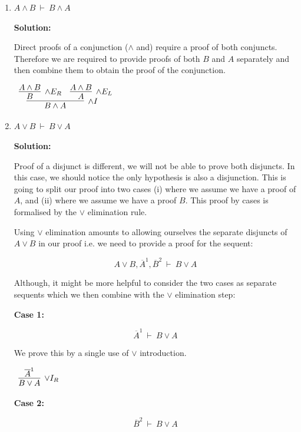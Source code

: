 \documentclass[11pt]{report}
\newcommand{\temp}[2]{{\overline{#2}}^{#1}}
\begin{document}
\begin{enumerate}
\begin{enumerate}
		\item $A \land B \ \vdash \ B \land A$
		

		\textbf{Solution:}

		Direct proofs of a conjunction ($\land$ and) require a proof of both conjuncts. Therefore we are required to provide proofs of both $B$ and $A$ separately and then combine them to obtain the proof of the conjunction. 

		\begin{center}
			$\begin{array}{c}
				\infer[\land I]{B \land A}
					{\infer[\land E_{R}]{B}
						{A \land B}
					&
					\infer[\land E_{L}]{A}
						{A \land B}}
			\end{array}$
		\end{center}
			
		\newpage
		\item $A \lor B \ \vdash \ B \lor A$
		
		\textbf{Solution:}

		Proof of a disjunct is different, we will not be able to prove both disjuncts. In this case, we should notice the only hypothesis is also a disjunction. This is going to split our proof into two cases (i) where we assume we have a proof of $A$, and (ii) where we assume we have a proof $B$. This proof by cases is formalised by the $\lor$ elimination rule. 

		Using $\lor$ elimination amounts to allowing ourselves the separate disjuncts of $A \lor B$ in our proof i.e. we need to provide a proof for the sequent: 

		$$A \lor B, \temp{1}{A}, \temp{2}{B} \ \vdash \ B \lor A $$

		Although, it might be more helpful to consider the two cases as separate sequents which we then combine with the $\lor$ elimination step: 

		\textbf{Case 1:}

		$$\temp{1}{A} \ \vdash \ B \lor A $$

		We prove this by a single use of $\lor$ introduction. 

		\begin{center}
			$\begin{array}{c}
				\infer[\lor I_{R}]{B \lor A}
					{\temp{1}{A}}
			\end{array}$
		\end{center}

		\textbf{Case 2:}

		$$\temp{2}{B} \ \vdash \ B \lor A $$
		

\end{enumerate}
\end{enumerate}
\end{document}
